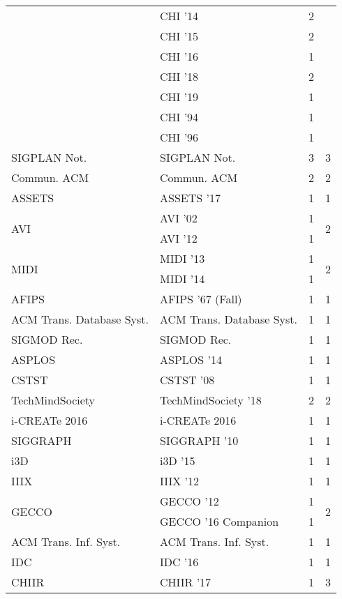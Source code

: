 \begin{table*}[t]
\begin{tabular}{llrr}
& CHI '14 & 2 &\\
& CHI '15 & 2 &\\
& CHI '16 & 1 &\\
& CHI '18 & 2 &\\
& CHI '19 & 1 &\\
& CHI '94 & 1 &\\
& CHI '96 & 1 &\\
\multirow{1}{*}{SIGPLAN Not.} & SIGPLAN Not. & 3 & \multirow{1}{*}{3}\\
\multirow{1}{*}{Commun. ACM} & Commun. ACM & 2 & \multirow{1}{*}{2}\\
\multirow{1}{*}{ASSETS } & ASSETS '17 & 1 & \multirow{1}{*}{1}\\
\multirow{2}{*}{AVI } & AVI '02 & 1 & \multirow{2}{*}{2}\\
& AVI '12 & 1 &\\
\multirow{2}{*}{MIDI } & MIDI '13 & 1 & \multirow{2}{*}{2}\\
& MIDI '14 & 1 &\\
\multirow{1}{*}{AFIPS } & AFIPS '67 (Fall) & 1 & \multirow{1}{*}{1}\\
\multirow{1}{*}{ACM Trans. Database Syst.} & ACM Trans. Database Syst. & 1 & \multirow{1}{*}{1}\\
\multirow{1}{*}{SIGMOD Rec.} & SIGMOD Rec. & 1 & \multirow{1}{*}{1}\\
\multirow{1}{*}{ASPLOS } & ASPLOS '14 & 1 & \multirow{1}{*}{1}\\
\multirow{1}{*}{CSTST } & CSTST '08 & 1 & \multirow{1}{*}{1}\\
\multirow{1}{*}{TechMindSociety } & TechMindSociety '18 & 2 & \multirow{1}{*}{2}\\
\multirow{1}{*}{i-CREATe 2016} & i-CREATe 2016 & 1 & \multirow{1}{*}{1}\\
\multirow{1}{*}{SIGGRAPH } & SIGGRAPH '10 & 1 & \multirow{1}{*}{1}\\
\multirow{1}{*}{i3D } & i3D '15 & 1 & \multirow{1}{*}{1}\\
\multirow{1}{*}{IIIX } & IIIX '12 & 1 & \multirow{1}{*}{1}\\
\multirow{2}{*}{GECCO } & GECCO '12 & 1 & \multirow{2}{*}{2}\\
& GECCO '16 Companion & 1 &\\
\multirow{1}{*}{ACM Trans. Inf. Syst.} & ACM Trans. Inf. Syst. & 1 & \multirow{1}{*}{1}\\
\multirow{1}{*}{IDC } & IDC '16 & 1 & \multirow{1}{*}{1}\\
\multirow{3}{*}{CHIIR } & CHIIR '17 & 1 & \multirow{3}{*}{3}\\

\end{tabular}
\end{table*}
